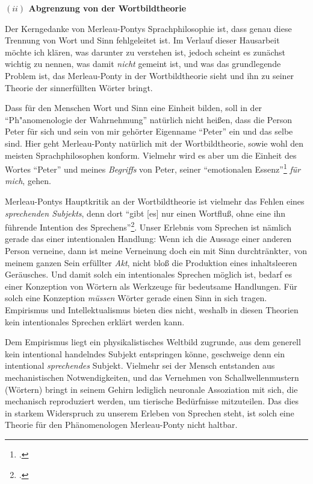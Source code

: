 \documentclass[a4paper, 12pt]{article}
\begin{document}
\begin{onehalfspace}
\vspace{5mm}

\noindent\textbf{$(ii)$ Abgrenzung von der Wortbildtheorie}

\noindent Der Kerngedanke von Merleau-Pontys Sprachphilosophie ist, dass genau diese Trennung von Wort und Sinn fehlgeleitet ist. Im Verlauf dieser Hausarbeit möchte ich klären, was darunter zu verstehen ist, jedoch scheint es zunächst wichtig zu nennen, was damit \emph{nicht} gemeint ist, und was das grundlegende Problem ist, das Merleau-Ponty in der Wortbildtheorie sieht und ihn zu seiner Theorie der sinnerfüllten Wörter bringt.

Dass für den Menschen Wort und Sinn eine Einheit bilden, soll in der "`Ph"anomenologie der Wahrnehmung"' natürlich nicht heißen, dass die Person Peter für sich und sein von mir gehörter Eigenname "`Peter"' ein und das selbe sind. Hier geht Merleau-Ponty natürlich mit der Wortbildtheorie, sowie wohl den meisten Sprachphilosophen konform. Vielmehr wird es aber um die Einheit des Wortes "`Peter"' und meines \emph{Begriffs} von Peter, seiner "`emotionalen Essenz"'\footnote{\Cite[Siehe][S. 222]{merleau1966phanomenologie}.} \emph{für mich}, gehen. 

Merleau-Pontys Hauptkritik an der Wortbildtheorie ist vielmehr das Fehlen eines \emph{sprechenden Subjekts}, denn dort "`gibt [es] nur einen Wortfluß, ohne eine ihn führende Intention des Sprechens"'\footnote{\Cite[Siehe][S. 208]{merleau1966phanomenologie}.}. Unser Erlebnis vom Sprechen ist nämlich gerade das einer intentionalen Handlung: Wenn ich die Aussage einer anderen Person verneine, dann ist meine Verneinung doch ein mit Sinn durchtränkter, von meinem ganzen Sein erfüllter \emph{Akt}, nicht bloß die Produktion eines inhaltsleeren Geräusches. Und damit solch ein intentionales Sprechen möglich ist, bedarf es einer Konzeption von Wörtern als Werkzeuge für bedeutsame Handlungen. Für solch eine Konzeption \emph{müssen} Wörter gerade einen Sinn in sich tragen. Empirismus und Intellektualismus bieten dies nicht, weshalb in diesen Theorien kein intentionales Sprechen erklärt werden kann.

Dem Empirismus liegt ein physikalistisches Weltbild zugrunde, aus dem generell kein intentional handelndes Subjekt entspringen könne, geschweige denn ein intentional \emph{sprechendes} Subjekt. Vielmehr sei der Mensch entstanden aus mechanistischen Notwendigkeiten, und das Vernehmen von Schallwellenmustern (Wörtern) bringt in seinem Gehirn lediglich neuronale Assoziation mit sich, die mechanisch reproduziert werden, um tierische Bedürfnisse mitzuteilen. Das dies in starkem Widerspruch zu unserem Erleben von Sprechen steht, ist solch eine Theorie für den Phänomenologen Merleau-Ponty nicht haltbar.


\end{onehalfspace}
\end{document}
